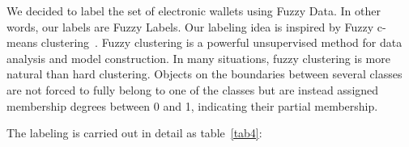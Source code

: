 \documentclass[../ICIT-Paper-2024.tex]{subfiles}
\begin{document}
We decided to label the set of electronic wallets using Fuzzy Data. In other words, our labels are Fuzzy Labels. Our labeling idea is inspired by Fuzzy c-means clustering~\cite{bezdek1984fcm}. Fuzzy clustering is a powerful unsupervised method for data analysis and model construction. In many situations, fuzzy clustering is more natural than hard clustering. Objects on the boundaries between several classes are not forced to fully belong to one of the classes but are instead assigned membership degrees between 0 and 1, indicating their partial membership.

The labeling is carried out in detail as table~\ref{tab4}:
\end{document}
